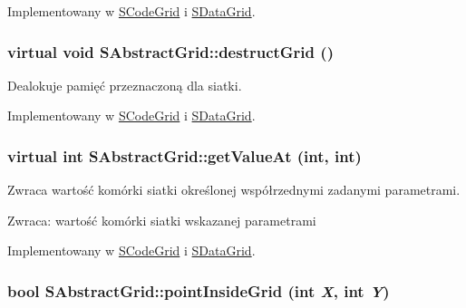 Implementowany w \hyperlink{classSCodeGrid_f15ba156433f88a40887e5ba72d9201a}{SCodeGrid} i \hyperlink{classSDataGrid_5af888335764c1ba959b6ef964223b6d}{SDataGrid}.\hypertarget{classSAbstractGrid_fb63d8cf5210c3606a3b7add19f06833}{
\subsubsection[{destructGrid}]{\setlength{\rightskip}{0pt plus 5cm}virtual void SAbstractGrid::destructGrid ()}}
\label{classSAbstractGrid_fb63d8cf5210c3606a3b7add19f06833}


Dealokuje pamięć przeznaczoną dla siatki. 

Implementowany w \hyperlink{classSCodeGrid_6bd4c1bf841bd09c2ffb2e019c08b4ed}{SCodeGrid} i \hyperlink{classSDataGrid_c9c0ef298fb96c56f9f9796720a41489}{SDataGrid}.\hypertarget{classSAbstractGrid_d8772e08d58f970d885775cb9682bf6d}{
\subsubsection[{getValueAt}]{\setlength{\rightskip}{0pt plus 5cm}virtual int SAbstractGrid::getValueAt (int, \/  int)}}
\label{classSAbstractGrid_d8772e08d58f970d885775cb9682bf6d}


Zwraca wartość komórki siatki określonej współrzednymi zadanymi parametrami. \begin{Desc}
\item[Zwraca:]wartość komórki siatki wskazanej parametrami \end{Desc}


Implementowany w \hyperlink{classSCodeGrid_c57d52a49a55c91068fe0eb541e721f8}{SCodeGrid} i \hyperlink{classSDataGrid_7f9dd63d74e36731875630a96ea8dd07}{SDataGrid}.\hypertarget{classSAbstractGrid_1e4823efb8b482d44466d8324f63dfb1}{
\subsubsection[{pointInsideGrid}]{\setlength{\rightskip}{0pt plus 5cm}bool SAbstractGrid::pointInsideGrid (int {\em X}, \/  int {\em Y})}}
\label{classSAbstractGrid_1e4823efb8b482d44466d8324f63dfb1}


